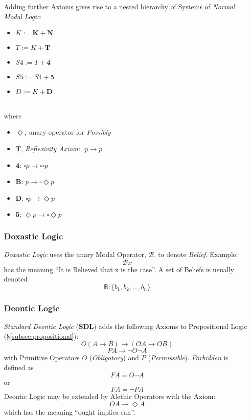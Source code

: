 \documentclass{article}
\begin{document}
Adding further Axioms gives rise to a nested hierarchy of Systems of
\emph{Normal Modal Logic}:

\begin{itemize}
\item $K := \mathbf{K} + \mathbf{N}$
\item $T := K + \mathbf{T}$
\item $S4 := T + \mathbf{4}$
\item $S5 := S4 + \mathbf{5}$
\item $D := K + \mathbf{D}$
\end{itemize} \hfill \\
where

\begin{itemize}
\item $\Diamond$, unary operator for \emph{Possibly}
\item $\mathbf{T}$, \emph{Reflexivity Axiom}: $\square p \rightarrow p$
\item $\mathbf{4}$: $\square p \rightarrow \square \square p$
\item $\mathbf{B}$: $p \rightarrow \square \Diamond p$
\item $\mathbf{D}$: $\square p \rightarrow \Diamond p$
\item $\mathbf{5}$: $\Diamond p \rightarrow \square \Diamond p$
\end{itemize}

\subsubsection{Doxastic Logic}

\emph{Doxastic Logic} uses the unary Modal Operator, $\mathcal{B}$, to
denote \emph{Belief}. Example:
\[
    \mathcal{B} x
\]
has the meaning ``It is Believed that x is the case''. A set of
Beliefs is usually denoted
\[
    \mathbb{B}: \{ b_1, b_2, \ldots, b_n \}
\]

\subsubsection{Deontic Logic}

\emph{Standard Deontic Logic} ($\mathbf{SDL}$) adds the following
Axioms to Propositional Logic (\S\ref{subsec:propositional}):
    \[O(A \rightarrow B) \rightarrow (OA \rightarrow OB)\]
    \[PA \rightarrow \neg O \neg A\]
with Primitive Operators $O$ (\emph{Obligatory}) and $P$
(\emph{Permissible}). \emph{Forbidden} is defined as
    \[FA = O \neg A\]
or
    \[FA = \neg P A\]
Deontic Logic may be extended by Alethic Operators with the Axiom:
    \[OA \rightarrow \Diamond A\]
which has the meaning ``ought implies can''.
\end{document}

